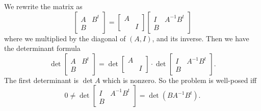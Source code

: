 \documentclass[10pt]{article}
\theoremstyle{definition}
\begin{document}
We rewrite the matrix as 
$$\begin{bmatrix}A & B^t \\ B\end{bmatrix} = \begin{bmatrix}A \\ & I\end{bmatrix} \begin{bmatrix}I & A^{-1}B^t \\ B\end{bmatrix}$$
where we multiplied by the diagonal of $(A, I)$, and its inverse.
Then we have the determinant formula 
$$\det \begin{bmatrix}A & B^t \\ B\end{bmatrix} = \det \begin{bmatrix}A \\ & I\end{bmatrix} \cdot \det \begin{bmatrix}I & A^{-1}B^t \\ B\end{bmatrix}.$$
The first determinant is $\det A$ which is nonzero. So the problem is well-posed iff 
$$0 \neq \det \begin{bmatrix}I & A^{-1}B^t \\ B\end{bmatrix} = \det(BA^{-1}B^t).$$
\end{document}
